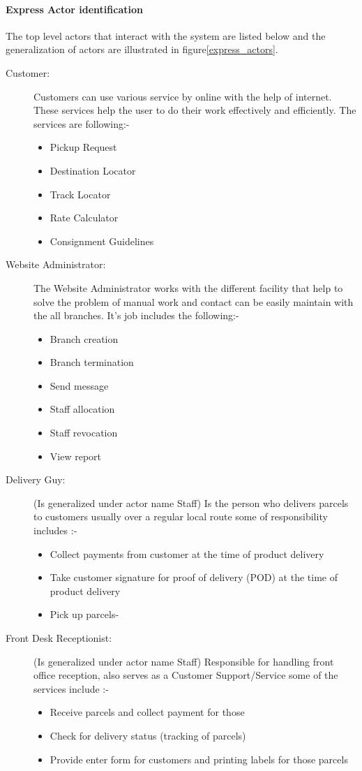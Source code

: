 \paragraph{Express Actor identification}
The top level actors that interact with the system are listed below and the generalization of actors are illustrated in figure\ref{express_actors}.
\begin{description}
	\item[Customer:] Customers can use various service by online with the help of internet. These services help the user to do their work effectively and efficiently. The services are following:-
	\begin{itemize}
		\item Pickup Request
		\item Destination Locator
		\item Track Locator
		\item Rate Calculator
		\item Consignment Guidelines
	\end{itemize}
	\item[Website Administrator:] The Website Administrator works with the different facility that help to solve the problem of manual work and contact can be easily maintain with the all branches. It's job includes the following:-
	\begin{itemize}
		\item Branch creation
		\item Branch termination
		\item Send message
		\item Staff allocation
		\item Staff revocation
		\item View report
	\end{itemize}
	\item[Delivery Guy:] (Is generalized under actor name Staff) Is the person who delivers parcels to customers usually over a regular local route some of responsibility includes :-
	\begin{itemize}
		\item Collect payments from customer at the time of product delivery
		\item Take customer signature for proof of delivery (POD) at the time of product delivery
		\item Pick up parcels-
	\end{itemize}
	\item[Front Desk Receptionist:] (Is generalized under actor name Staff) Responsible for handling front office reception, also serves as a Customer Support/Service some of the services include :-
	\begin{itemize}
		\item Receive parcels and collect payment for those
		\item Check for delivery status (tracking of parcels)
		\item Provide enter form for customers and printing labels for those parcels
	\end{itemize}
\end{description} 


